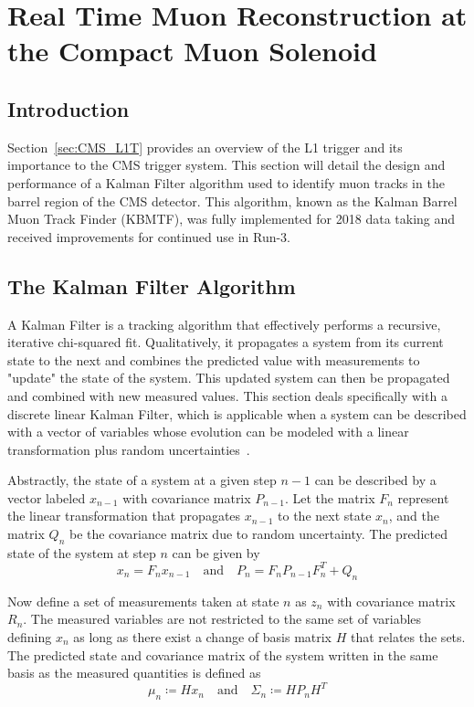 
\chapter{Real Time Muon Reconstruction at the Compact Muon Solenoid}
\label{chap:kbmtf}

\section{Introduction} \label{sec:kbmtf_intro}
Section~\ref{sec:CMS_L1T} provides an overview of the L1 trigger and its importance to the CMS trigger system. This section will detail the design and performance of a Kalman Filter algorithm used to identify muon tracks in the barrel region of the CMS detector. This algorithm, known as the Kalman Barrel Muon Track Finder (KBMTF), was fully implemented for 2018 data taking and received improvements for continued use in Run-3.

\section{The Kalman Filter Algorithm} \label{sec:kalman_filter}
A Kalman Filter is a tracking algorithm that effectively performs a recursive, iterative chi-squared fit. Qualitatively, it propagates a system from its current state to the next and combines the predicted value with measurements to "update" the state of the system. This updated system can then be propagated and combined with new measured values. This section deals specifically with a discrete linear Kalman Filter, which is applicable when a system can be described with a vector of variables whose evolution can be modeled with a linear transformation plus random uncertainties~\cite{FRUHWIRTH1987444}.

Abstractly, the state of a system at a given step $n-1$ can be described by a vector labeled $x_{n-1}$ with covariance matrix $P_{n-1}$. Let the matrix $F_n$ represent the linear transformation that propagates $x_{n-1}$ to the next state $x_{n}$, and the matrix $Q_{n}$ be the covariance matrix due to random uncertainty. The predicted state of the system at step $n$ can be given by
\begin{equation}
	\label{eq:prop}
	x_{n}=F_{n}x_{n-1} \quad \textrm{and} \quad P_{n}=F_nP_{n-1}F_n^T+Q_n
\end{equation}

Now define a set of measurements taken at state $n$ as $z_n$ with covariance matrix $R_n$. The measured variables are not restricted to the same set of variables defining $x_n$ as long as there exist a change of basis matrix $H$ that relates the sets. The predicted state and covariance matrix of the system written in the same basis as the measured quantities is defined as
\begin{equation}
	\label{eq:changeOfBasis}
	\mu_n\coloneqq Hx_n \quad \textrm{and} \quad \Sigma_n\coloneqq HP_nH^{T}
\end{equation}

